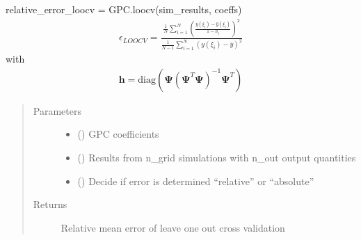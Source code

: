 \documentclass[letterpaper,10pt,english,openany,oneside]{sphinxmanual}
\begin{document}
\begin{fulllineitems}
\begin{fulllineitems}
relative\_error\_loocv = GPC.loocv(sim\_results, coeffs)
\begin{equation*}
\begin{split}\epsilon_{LOOCV} = \frac{\frac{1}{N}\sum_{i=1}^N \left( \frac{y(\xi_i) - \hat{y}(\xi_i)}{1-h_i} \right)^2}{\frac{1}{N-1}\sum_{i=1}^N \left( y(\xi_i) - \bar{y} \right)^2}\end{split}
\end{equation*}
with
\begin{equation*}
\begin{split}\mathbf{h} = \mathrm{diag}(\mathbf{\Psi} (\mathbf{\Psi}^T \mathbf{\Psi})^{-1} \mathbf{\Psi}^T)\end{split}
\end{equation*}\begin{quote}\begin{description}
\item[{Parameters}] \leavevmode\begin{itemize}
\item {} 
 (\sphinxstyleliteralemphasis{\sphinxupquote{ {[}}}\sphinxstyleliteralemphasis{\sphinxupquote{{]}}}) \textendash{} GPC coefficients

\item {} 
 (\sphinxstyleliteralemphasis{\sphinxupquote{ {[}}}\sphinxstyleliteralemphasis{\sphinxupquote{{]}}}) \textendash{} Results from n\_grid simulations with n\_out output quantities

\item {} 
 (\sphinxstyleliteralemphasis{\sphinxupquote{, }}\sphinxstyleliteralemphasis{\sphinxupquote{, }}) \textendash{} Decide if error is determined “relative” or “absolute”

\end{itemize}

\item[{Returns}] \leavevmode
{} \textendash{} Relative mean error of leave one out cross validation


\end{description}
\end{quote}
\end{fulllineitems}
\end{fulllineitems}
\end{document}
